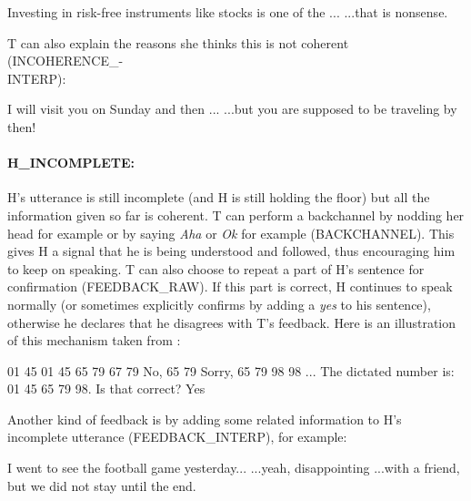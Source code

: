 						\begin{dialogue}
							 Investing in risk-free instruments like stocks is one of the ...
							 ...that is nonsense.
						\end{dialogue}
						
						T can also explain the reasons she thinks this is not coherent (INCOHERENCE\_-\\INTERP):
						
						\begin{dialogue}
							 I will visit you on Sunday and then ...
							 ...but you are supposed to be traveling by then!
						\end{dialogue}
						
					\paragraph{H\_INCOMPLETE:} H's utterance is still incomplete (and H is still holding the floor) but all the information given so far is coherent. T can perform a backchannel by nodding her head for example or by saying \textit{Aha} or \textit{Ok} for example (BACKCHANNEL). This gives H a signal that he is being understood and followed, thus encouraging him to keep on speaking. T can also choose to repeat a part of H's sentence for confirmation (FEEDBACK\_RAW). If this part is correct, H continues to speak normally (or sometimes explicitly confirms by adding a \textit{yes} to his sentence), otherwise he declares that he disagrees with T's feedback. Here is an illustration of this mechanism taken from \cite{Khouzaimi2014a}:
					
						\begin{dialogue}
							\speak{H} 01 45
							\speak{T} 01 45
							\speak{H} 65 79
							\speak{T} 67 79
							\speak{H} No, 65 79
							\speak{T} Sorry, 65 79
							\speak{H} 98
							\speak{T} 98
							\speak{H} ...
							 The dictated number is: 01 45 65 79 98. Is that correct?
							\speak{H} Yes
						\end{dialogue}
						
						Another kind of feedback is by adding some related information to H's incomplete utterance (FEEDBACK\_INTERP), for example:
						
						\begin{dialogue}
							 I went to see the football game yesterday...
							 ...yeah, disappointing
							 ...with a friend, but we did not stay until the end.
						\end{dialogue}
                        
